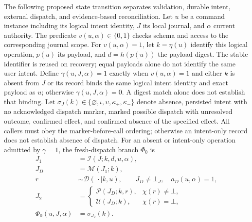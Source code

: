 The following proposed state transition separates validation, durable intent, external dispatch, and evidence-based reconciliation. Let $u$ be a command instance including its logical intent identity, $J$ its local journal, and $\alpha$ current authority. The predicate $v(u,\alpha)\in\{0,1\}$ checks schema and access to the corresponding journal scope. For $v(u,\alpha)=1$, let $k=\eta(u)$ identify this logical operation, $p(u)$ its payload, and $d=h(p(u))$ the payload digest. The stable identifier is reused on recovery; equal payloads alone do not identify the same user intent. Define $\gamma(u,J,\alpha)=1$ exactly when $v(u,\alpha)=1$ and either $k$ is absent from $J$ or its record binds the same logical intent identity and exact payload as $u$; otherwise $\gamma(u,J,\alpha)=0$. A digest match alone does not establish that binding. Let $\sigma_J(k)\in\{\varnothing,\iota,\upsilon,\kappa_+,\kappa_-\}$ denote absence, persisted intent with no acknowledged dispatch marker, marked possible dispatch with unresolved outcome, confirmed effect, and confirmed absence of the specified effect. All callers must obey the marker-before-call ordering; otherwise an intent-only record does not establish absence of dispatch. For an absent or intent-only operation admitted by $\gamma=1$, the fresh-dispatch branch $\Phi_0$ is
\begin{equation}
\begin{aligned}
 J_1&=\mathcal I(J;k,d,u,\alpha),\\
 J_D&=\mathcal M(J_1;k),\\
 r&\sim\mathcal D(\,\cdot\mid k,u),\qquad J_D\ne\bot_J,\quad a_D(u,\alpha)=1,\\
 J_2&=
 \begin{cases}
  \mathcal P(J_D;k,r),&\chi(r)\ne\bot,\\
  \mathcal U(J_D;k),&\chi(r)=\bot,
 \end{cases}\\
 \Phi_0(u,J,\alpha)&=\sigma_{J_2}(k).
\end{aligned}
\label{eq:C13:intent_dispatch_receipt}
\end{equation}
